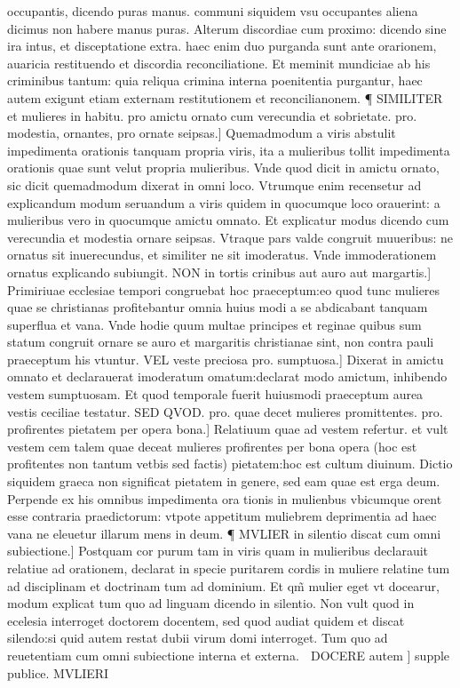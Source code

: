 \documentclass{article}
\begin{document}
\begin{pages}
occupantis, dicendo puras manus. communi siquidem vsu occupantes aliena dicimus non habere manus puras. Alterum discordiae cum proximo: dicendo sine ira intus, et disceptatione extra. haec enim duo purganda sunt ante orarionem, auaricia restituendo et discordia reconciliatione. Et meminit mundiciae ab his criminibus tantum: quia reliqua crimina interna poenitentia purgantur, haec autem exigunt etiam externam restitutionem et reconcilianonem. ¶ SIMILITER et mulieres in habitu. pro amictu ornato cum verecundia et sobrietate. pro. modestia, ornantes, pro ornate seipsas.] Quemadmodum a viris abstulit impedimenta orationis tanquam propria viris, ita a mulieribus tollit impedimenta orationis quae sunt velut propria mulieribus. Vnde quod dicit in amictu ornato, sic dicit quemadmodum dixerat in omni loco. Vtrumque enim recensetur ad explicandum modum seruandum a viris quidem in quocumque loco orauerint: a mulieribus vero in quocumque amictu omnato. Et explicatur modus dicendo cum verecundia et modestia ornare seipsas. Vtraque pars valde congruit muueribus: ne ornatus sit inuerecundus, et similiter ne sit imoderatus. Vnde immoderationem ornatus explicando subiungit. NON in tortis crinibus aut auro aut margartis.] Primiriuae ecclesiae tempori congruebat hoc praeceptum:eo quod tunc mulieres quae se christianas profitebantur omnia huius modi a se abdicabant tanquam superflua et vana. Vnde hodie quum multae principes et reginae quibus sum statum congruit ornare se auro et margaritis christianae sint, non contra pauli praeceptum his vtuntur. VEL veste preciosa pro. sumptuosa.] Dixerat in amictu omnato et declarauerat imoderatum omatum:declarat modo amictum, inhibendo vestem sumptuosam. Et quod temporale fuerit huiusmodi praeceptum aurea vestis ceciliae testatur. SED QVOD. pro. quae decet mulieres promittentes. pro. profirentes pietatem per opera bona.] Relatiuum quae ad vestem refertur. et vult vestem cem talem quae deceat mulieres profirentes per bona opera (hoc est profitentes non tantum vetbis sed factis) pietatem:hoc est cultum diuinum. Dictio siquidem graeca non significat pietatem in genere, sed eam quae est erga deum. Perpende ex his omnibus impedimenta ora tionis in mulienbus vbicumque orent esse contraria praedictorum: vtpote appetitum muliebrem deprimentia ad haec vana ne eleuetur illarum mens in deum. ¶ MVLIER in silentio discat cum omni subiectione.] Postquam cor purum tam in viris quam in mulieribus declarauit relatiue ad orationem, declarat in specie puritarem cordis in muliere relatine tum ad disciplinam et doctrinam tum ad dominium. Et qm̃ mulier eget vt docearur, modum explicat tum quo ad linguam dicendo in silentio. Non vult quod in ecelesia interroget doctorem docentem, sed quod audiat quidem et discat silendo:si quid autem restat dubii virum domi interroget. Tum quo ad reuetentiam cum omni subiectione interna et externa.  DOCERE autem ] supple publice. MVLIERI  \pend
\marginpar{[ p.142 ]}

\end{pages}
\end{document}
